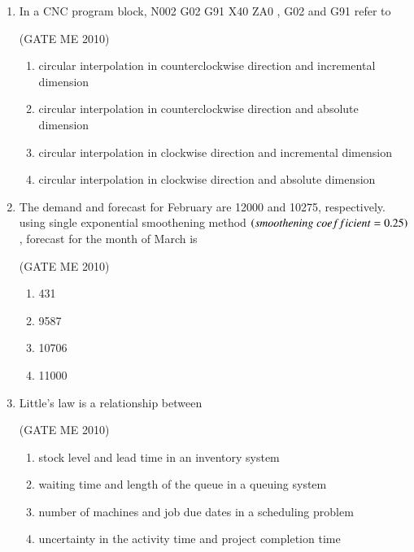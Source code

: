 \documentclass[journal,12pt,onecolumn]{IEEEtran}
\theoremstyle{remark}
\begin{document}
\begin{enumerate}
\begin{multicols}{2}
\begin{enumerate}
\item  -0.025, 0.016

\item -0.009, $\pm{0.008}$

\item  -0.009, 0.016
 \end{enumerate}
\end{multicols}

\item In a CNC program block, N002 G02 G91 X40 ZA0  , G02 and G91 refer to

  \hfill{(GATE ME 2010)}
  
\begin{enumerate}

    \item circular interpolation in counterclockwise direction and incremental dimension
    \item  circular interpolation in counterclockwise direction and absolute dimension
    \item circular interpolation in clockwise direction and incremental dimension
    \item circular interpolation in clockwise direction and absolute dimension
    \end{enumerate}
 


\item The demand and forecast for February are 12000 and 10275, respectively. using single exponential smoothening method $\left(smoothening\;coefficient = 0.25\right)$, forecast for the month of March is

 \hfill{(GATE ME 2010)}
 
\begin{multicols}{4}
\begin{enumerate}

\item 431
\item 9587
\item 10706
\item 11000
 \end{enumerate}
\end{multicols}



\item Little's law is a relationship between

  \hfill{(GATE ME 2010)}
  
\begin{enumerate}

\item stock level and lead time in an inventory system
\item waiting time and length of the queue in a queuing system
\item number of machines and job due dates in a scheduling problem
\item uncertainty in the activity time and project completion time
\end{enumerate}
 



\end{enumerate}
\end{document}
